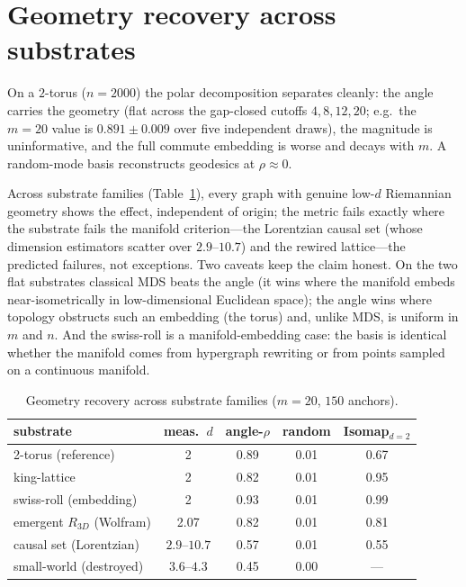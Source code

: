 \documentclass[11pt]{article}
\begin{document}
\section{Geometry recovery across substrates}\label{sec:recovery}
On a $2$-torus ($n=2000$) the polar decomposition separates cleanly: the angle carries
the geometry (flat across the gap-closed cutoffs $4,8,12,20$; e.g.\ the $m{=}20$ value
is $0.891\pm0.009$ over five independent draws), the magnitude is uninformative, and
the full commute embedding is
worse and decays with $m$. A random-mode basis reconstructs geodesics at $\rho\approx0$.

Across substrate families (Table~\ref{tab:substrates}), every graph with genuine low-$d$
Riemannian geometry shows the effect, independent of origin; the metric fails exactly
where the substrate fails the manifold criterion---the Lorentzian causal set (whose
dimension estimators scatter over $2.9$--$10.7$) and the rewired lattice---the predicted
failures, not exceptions. Two caveats keep the claim honest. On the two flat substrates
classical MDS beats the angle (it wins where the manifold embeds near-isometrically in
low-dimensional Euclidean space); the angle wins where topology obstructs such an
embedding (the torus) and, unlike MDS, is uniform in $m$ and $n$. And the swiss-roll is a
manifold-embedding case: the basis is identical whether the manifold comes from
hypergraph rewriting or from points sampled on a continuous manifold.

\begin{table}[h]\centering
\caption{Geometry recovery across substrate families ($m{=}20$, $150$ anchors).}
\label{tab:substrates}
\begin{tabular}{@{}lcccc@{}}
\toprule
substrate & meas.\ $d$ & angle-$\rho$ & random & Isomap$_{d=2}$ \\
\midrule
2-torus (reference)         & 2               & 0.89 & 0.01 & 0.67 \\
king-lattice                & 2               & 0.82 & 0.01 & 0.95 \\
swiss-roll (embedding)      & 2               & 0.93 & 0.01 & 0.99 \\
emergent $R_{3D}$ (Wolfram) & 2.07            & 0.82 & 0.01 & 0.81 \\
causal set (Lorentzian)     & $2.9$--$10.7$   & 0.57 & 0.01 & 0.55 \\
small-world (destroyed)     & $3.6$--$4.3$    & 0.45 & 0.00 & --- \\
\bottomrule
\end{tabular}
\end{table}
\end{document}
